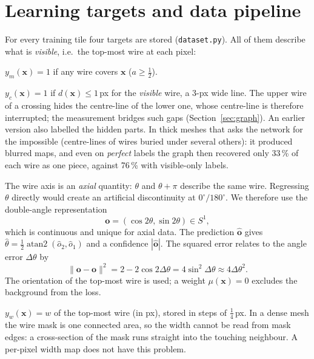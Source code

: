 \documentclass[11pt,a4paper]{article}
\newcommand{\code}[1]{\texttt{#1}}
\begin{document}
\section{Learning targets and data pipeline}\label{sec:targets}
For every training tile four targets are stored (\code{dataset.py}). All of them describe what is \emph{visible}, i.e.\ the top-most wire at each pixel:
\begin{description}[leftmargin=1.2em,itemsep=1pt]
\item[Mask] $y_m(\mathbf x)=1$ if any wire covers $\mathbf x$ ($a\ge\tfrac12$).
\item[Centre-line] $y_c(\mathbf x)=1$ if $d(\mathbf x)\le1$\,px for the \emph{visible} wire, a 3-px wide line. The upper wire of a crossing hides the centre-line of the lower one, whose centre-line is therefore interrupted; the measurement bridges such gaps (Section~\ref{sec:graph}). An earlier version also labelled the hidden parts. In thick meshes that asks the network for the impossible (centre-lines of wires buried under several others): it produced blurred maps, and even on \emph{perfect} labels the graph then recovered only 33\,\% of each wire as one piece, against 76\,\% with visible-only labels.
\item[Orientation] The wire axis is an \emph{axial} quantity: $\theta$ and $\theta+\pi$ describe the same wire. Regressing $\theta$ directly would create an artificial discontinuity at $0^\circ/180^\circ$. We therefore use the double-angle representation
\begin{equation}
\mathbf o=(\cos2\theta,\sin2\theta)\in S^1,
\end{equation}
which is continuous and unique for axial data. The prediction $\hat{\mathbf o}$ gives $\hat\theta=\tfrac12\operatorname{atan2}(\hat o_2,\hat o_1)$ and a confidence $|\hat{\mathbf o}|$. The squared error relates to the angle error $\Delta\theta$ by
\begin{equation}
\|\mathbf o-\hat{\mathbf o}\|^2 = 2-2\cos 2\Delta\theta = 4\sin^2\Delta\theta \approx 4\Delta\theta^2 .
\end{equation}
The orientation of the top-most wire is used; a weight $\mu(\mathbf x)=0$ excludes the background from the loss.
\item[Width] $y_w(\mathbf x)=w$ of the top-most wire (in px), stored in steps of $\tfrac14$\,px. In a dense mesh the wire mask is one connected area, so the width cannot be read from mask edges: a cross-section of the mask runs straight into the touching neighbour. A per-pixel width map does not have this problem.
\end{description}
\end{document}

